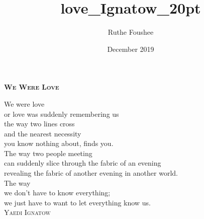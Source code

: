\documentclass[20pt]{memoir}
\title{love_Ignatow_20pt}
\author{Ruthe Foushee}
\date{December 2019}
\begin{document}
\thispagestyle{empty}
\textbf{\textsc{\large We Were Love}}
\vspace{26pt}

We were love\\
or love was suddenly remembering us\\
the way two lines cross\\
and the nearest necessity\\
you know nothing about, finds you.\\
The way two people meeting\\
can suddenly slice through the fabric of an evening\\
revealing the fabric of another evening in another world.\\
The way\\
we don’t have to know everything;\\
we just have to want to let everything know us.\\

\vspace{11pt}
\hspace{90pt} \textsc{Yaedi Ignatow}\\
\vfill
\end{document}
